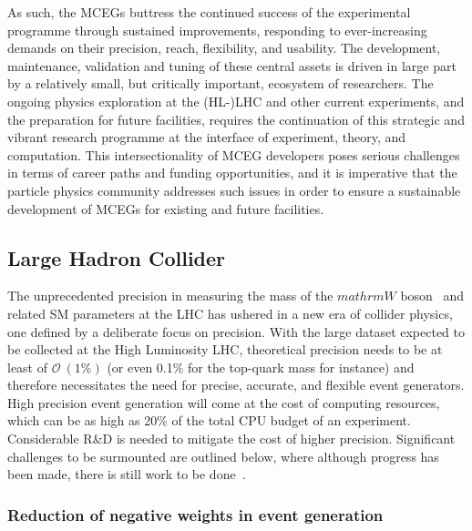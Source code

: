 \documentclass[10pt,a4paper]{article}
\begin{document}
As such, the MCEGs buttress the continued success of the experimental
programme through sustained improvements, responding to ever-increasing
demands on their precision, reach, flexibility, and usability. The
development, maintenance, validation and tuning of these central assets
is driven in large part by a relatively small, but critically important,
ecosystem of researchers. The ongoing physics exploration at the
(HL-)LHC and other current experiments, and the preparation for future
facilities, requires the continuation of this strategic and vibrant
research programme at the interface of experiment, theory, and
computation. This intersectionality of MCEG developers poses serious
challenges in terms of career paths and funding opportunities, and it is
imperative that the particle physics community addresses such issues in
order to ensure a sustainable development of MCEGs for existing and
future facilities.

\subsection{Large Hadron Collider}\label{large-hadron-collider}

The unprecedented precision in measuring the mass of the
$mathrm{W}$
boson~\cite{CMS:2024lrd} and related SM
parameters at the LHC has ushered in a new era of collider physics, one
defined by a deliberate focus on precision. With the large dataset
expected to be collected at the High Luminosity LHC, theoretical
precision needs to be at least of
$\mathcal{O}~(1\%)$ (or even
0.1\% for the top-quark mass for instance) and therefore necessitates
the need for precise, accurate, and flexible event generators. High
precision event generation will come at the cost of computing resources,
which can be as high as 20\% of the total CPU budget of an
experiment. Considerable R\&D is needed to mitigate the
cost of higher precision. Significant challenges to be surmounted are
outlined below, where although progress has been made, there is still
work to be
done~\cite{HSFPhysicsEventGeneratorWG:2020gxw,maltoni2022tf07snowmassreporttheory,10.21468/SciPostPhys.16.5.130}.

\subsubsection{Reduction of negative weights in event
generation}\label{reduction-of-negative-weights-in-event-generation}
\end{document}
